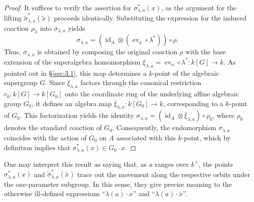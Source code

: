 \documentclass[11pt,a4paper,reqno,noamsfonts]{amsart}
\numberwithin{equation}{section}
\theoremstyle{definition}
\theoremstyle{remark}
\DeclareMathOperator{\id}{id}
\DeclareMathOperator{\ev}{ev}
\begin{document}
\begin{proof}
It suffices to verify the assertion for $\sigma_{\lambda,a}^*(x)$, as the argument for the lifting $\tilde{\sigma}_{\lambda,a}^*(\tilde{x})$ proceeds identically. Substituting the expression for the induced coaction $\rho_{\lambda}$ into $\sigma_{\lambda,a}$ yields
$$
\sigma _{\lambda ,a} =  (\id_{A} \otimes (\ev_a \circ \lambda^{*})) \circ \rho.
$$
Thus, $\sigma_{\lambda,a}$ is obtained by composing the original coaction $\rho$ with the base extension of the superalgebra homomorphism $\xi_{\lambda,a} = \ev_a \circ \lambda^{*} \colon k[G] \to k$. As pointed out in \S\ref{sec:3.1}, this map determines a $k$-point of the algebraic supergroup $G$. Since $\xi_{\lambda,a}$ factors through the canonical restriction $r_0 \colon k[G] \to k[G_0]$ onto the coordinate ring of the underlying affine algebraic group $G_0$, it defines an algebra map $\bar{\xi}_{\lambda,a} \colon k[G_0] \to k$, corresponding to a $k$-point of $G_0$. This factorization yields the identity $\sigma_{\lambda,a} = (\id_A \otimes \bar{\xi}_{\lambda,a}) \circ \rho_0$, where $\rho_0$ denotes the standard coaction of $G_0$. Consequently, the endomorphism $\sigma_{\lambda,a}$ coincides with the action of $G_0$ on $A$ associated with this $k$-point, which by definition implies that $\sigma_{\lambda,a}^*(x) \in G_0 \cdot x$.
\end{proof}

One may interpret this result as saying that, as $a$ ranges over $k^{\times}$, the points $\sigma_{\lambda,a}^*(x)$ and $\tilde{\sigma}_{\lambda,a}^*(\tilde{x})$ trace out the movement along the respective orbits under the one-parameter subgroup. In this sense, they give precise meaning to the otherwise ill-defined expressions ``$\lambda(a) \cdot x$'' and ``$\lambda(a) \cdot \tilde{x}$''.  
\end{document}
